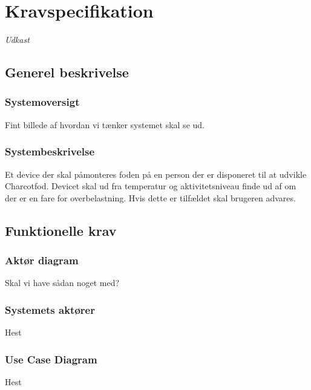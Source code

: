 \chapter{Kravspecifikation}
\textit{Udkast}\\

\section{Generel beskrivelse}
\subsection{Systemoversigt}
Fint billede af hvordan vi tænker systemet skal se ud.

\subsection{Systembeskrivelse}
Et device der skal påmonteres foden på en person der er disponeret til at udvikle Charcotfod. Devicet skal ud fra temperatur og aktivitetsniveau finde ud af om der er en fare for overbelastning. Hvis dette er tilfældet skal brugeren advares.



\section{Funktionelle krav}
\subsection{Aktør diagram}
Skal vi have sådan noget med?

\subsection{Systemets aktører}
Hest

\subsection{Use Case Diagram}
Hest

